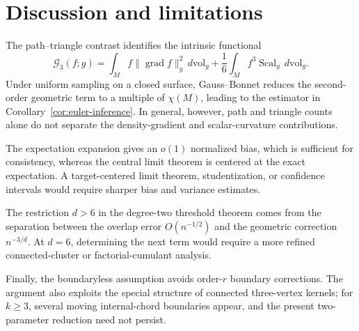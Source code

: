 \documentclass[11pt]{article}
\theoremstyle{remark}
\newcommand{\Scal}{\operatorname{Scal}}
\newcommand{\grad}{\operatorname{grad}}
\numberwithin{equation}{section}
\begin{document}
\section{Discussion and limitations}
\label{sec:discussion}

The path--triangle contrast identifies the intrinsic functional
\[
\mathcal G_3(f;g)
=
\int_M f\|\grad f\|_g^2\,d\mathrm{vol}_g
+\frac16\int_M f^3\Scal_g\,d\mathrm{vol}_g.
\]
Under uniform sampling on a closed surface, Gauss--Bonnet reduces the
second-order geometric term to a multiple of $\chi(M)$, leading to the
estimator in Corollary~\ref{cor:euler-inference}.  In general, however,
path and triangle counts alone do not separate the density-gradient and
scalar-curvature contributions.

The expectation expansion gives an $o(1)$ normalized bias, which is
sufficient for consistency, whereas the central limit theorem is centered
at the exact expectation.  A target-centered limit theorem, studentization,
or confidence intervals would require sharper bias and variance estimates.

The restriction $d>6$ in the degree-two threshold theorem comes from the
separation between the overlap error $O(n^{-1/2})$ and the geometric
correction $n^{-3/d}$.  At $d=6$, determining the next term would require a
more refined connected-cluster or factorial-cumulant analysis.

Finally, the boundaryless assumption avoids order-$r$ boundary corrections.
The argument also exploits the special structure of connected
three-vertex kernels; for $k\ge3$, several moving internal-chord boundaries
appear, and the present two-parameter reduction need not persist.

\appendix
\end{document}
